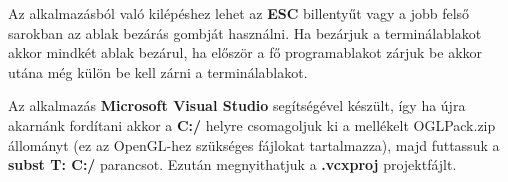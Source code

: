 Az alkalmazásból való kilépéshez lehet az \textbf{ESC} billentyűt vagy a jobb felső sarokban az ablak bezárás gombját használni. Ha bezárjuk a terminálablakot akkor mindkét ablak bezárul, ha először a fő programablakot zárjuk be akkor utána még külön be kell zárni a terminálablakot.

Az alkalmazás \textbf{Microsoft Visual Studio} segítségével készült, így ha újra akarnánk fordítani akkor a \textbf{C:/} helyre csomagoljuk ki a mellékelt OGLPack.zip állományt (ez az OpenGL-hez szükséges fájlokat tartalmazza), majd futtassuk a \textbf{subst T: C:/} parancsot. Ezután megnyithatjuk a \textbf{.vcxproj} projektfájlt.



